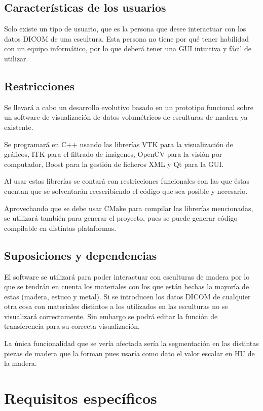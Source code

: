 \subsection{Características de los usuarios}

Solo existe un tipo de usuario, que es la persona que desee interactuar con los datos DICOM de una escultura. Esta persona no tiene por qué tener habilidad con un equipo informático, por lo que \myTitle deberá tener una GUI intuitiva y fácil de utilizar.

\subsection{Restricciones}

Se llevará a cabo un desarrollo evolutivo basado en un prototipo funcional sobre un software de visualización de datos volumétricos de esculturas de madera ya existente.

Se programará en C++ usando las librerías VTK para la visualización de gráficos, ITK para el filtrado de imágenes, OpenCV para la visión por computador, Boost para la gestión de ficheros XML y Qt para la GUI.

Al usar estas librerías se contará con restricciones funcionales con las que éstas cuentan que se solventarán  reescribiendo el código que sea posible y necesario. 

Aprovechando que se debe usar CMake para compilar las librerías mencionadas, se utilizará también para generar el proyecto, pues se puede generar código compilable en distintas plataformas.

\subsection{Suposiciones y dependencias}

El software se utilizará para poder interactuar con esculturas de madera por lo que se tendrán en cuenta los materiales con los que están hechas la mayoría de estas (madera, estuco y metal). Si se introducen los datos DICOM de cualquier otra cosa con materiales distintos a los utilizados en las esculturas no se visualizará correctamente. Sin embargo se podrá editar la función de transferencia para su correcta visualización.

La única funcionalidad que se vería afectada sería la segmentación en las distintas piezas de madera que la forman pues usaría como dato el valor escalar en HU de la madera.

\section{Requisitos específicos}

